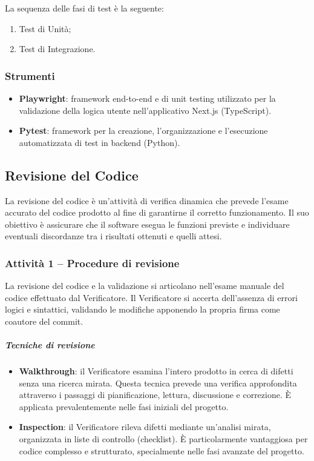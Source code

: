 \documentclass[a4paper, 11pt, oneside]{scrartcl}
\begin{document}
La sequenza delle fasi di test è la seguente:
\begin{enumerate}
    \item Test di Unità;
    \item Test di Integrazione.
\end{enumerate}

\subsubsection{Strumenti}
\begin{itemize}
    \item \textbf{Playwright}: framework end-to-end e di unit testing utilizzato per la validazione della logica utente nell'applicativo Next.js (TypeScript).
    \item \textbf{Pytest}: framework per la creazione, l'organizzazione e l'esecuzione automatizzata di test in backend (Python).
\end{itemize}

\subsection{Revisione del Codice}
\label{sec:revisione_codice}

La revisione del codice è un'attività di verifica dinamica che prevede l'esame accurato del codice prodotto al fine di garantirne il corretto funzionamento. Il suo obiettivo è assicurare che il software{\scriptsize{}} esegua le funzioni previste e individuare eventuali discordanze tra i risultati ottenuti e quelli attesi.

\subsubsection{Attività 1 -- Procedure di revisione}

La revisione del codice e la validazione si articolano nell'esame manuale del codice effettuato dal Verificatore. Il Verificatore si accerta dell'assenza di errori logici e sintattici, validando le modifiche apponendo la propria firma come coautore del commit.

\subparagraph{Tecniche di revisione}
\begin{itemize}
    \item \textbf{Walkthrough}{\scriptsize{}}: il Verificatore esamina l'intero prodotto in cerca di difetti senza una ricerca mirata. Questa tecnica prevede una verifica approfondita attraverso i passaggi di pianificazione, lettura, discussione e correzione. È applicata prevalentemente nelle fasi iniziali del progetto.
    \item \textbf{Inspection}{\scriptsize{}}: il Verificatore rileva difetti mediante un'analisi mirata, organizzata in liste di controllo (checklist). È particolarmente vantaggiosa per codice complesso e strutturato, specialmente nelle fasi avanzate del progetto.
\end{itemize}
\end{document}
